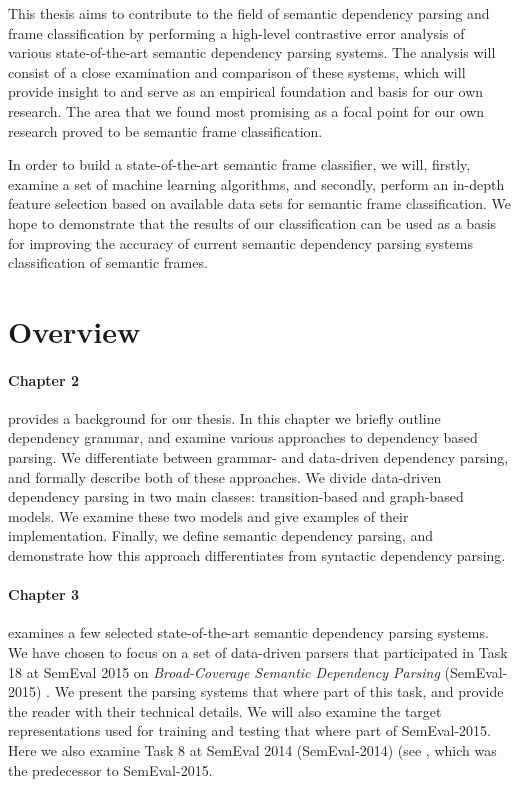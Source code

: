 This thesis aims to contribute to the field of semantic dependency parsing and frame classification by performing a high-level contrastive error analysis of various state-of-the-art semantic dependency parsing systems. The analysis will consist of a close examination and comparison of these systems, which will provide insight to and serve as an empirical foundation and basis for our own research. The area that we found most promising as a focal point for our own research proved to be semantic frame classification.

In order to build a state-of-the-art semantic frame classifier, we will, firstly, examine a set of machine learning algorithms, and secondly, perform an in-depth feature selection based on available data sets for semantic frame classification. We hope to demonstrate that the results of our classification can be used as a basis for improving the accuracy of current semantic dependency parsing systems classification of semantic frames.

\section{Overview} 

\paragraph{Chapter 2} provides a background for our thesis. In this chapter we briefly outline dependency grammar, and examine various approaches to dependency based parsing. We differentiate between grammar- and data-driven dependency parsing, and formally describe both of these approaches. We divide data-driven dependency parsing in two main classes: transition-based and graph-based models. We examine these two models and give examples of their implementation. Finally, we define semantic dependency parsing, and demonstrate how this approach differentiates from syntactic dependency parsing.

\paragraph{Chapter 3} examines a few selected state-of-the-art semantic dependency parsing systems. We have chosen to focus on a set of data-driven parsers that participated in Task 18 at SemEval 2015 on \textit{Broad-Coverage Semantic Dependency Parsing} (SemEval-2015) \cite{Oepen:15}. We present the parsing systems that where part of this task, and provide the reader with their technical details. We will also examine the target representations used for training and testing that where part of SemEval-2015. Here we also examine Task 8 at SemEval 2014 (SemEval-2014) (see , which was the predecessor to SemEval-2015.

